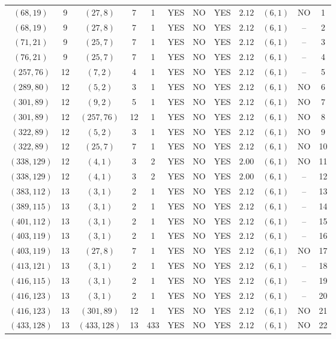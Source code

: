 \begin{longtable}{|c|c|c|c|c|c|c|c|c|c|c|c|}
$(68,19)$ & 9 & $(27,8)$ & 7 & 1 & YES & NO & YES & $2.12$ & $(6,1)$ & NO & 1\\
$(68,19)$ & 9 & $(27,8)$ & 7 & 1 & YES & NO & YES & $2.12$ & $(6,1)$ & -- & 2\\
$(71,21)$ & 9 & $(25,7)$ & 7 & 1 & YES & NO & YES & $2.12$ & $(6,1)$ & -- & 3\\
$(76,21)$ & 9 & $(25,7)$ & 7 & 1 & YES & NO & YES & $2.12$ & $(6,1)$ & -- & 4\\
$(257,76)$ & 12 & $(7,2)$ & 4 & 1 & YES & NO & YES & $2.12$ & $(6,1)$ & -- & 5\\
$(289,80)$ & 12 & $(5,2)$ & 3 & 1 & YES & NO & YES & $2.12$ & $(6,1)$ & NO & 6\\
$(301,89)$ & 12 & $(9,2)$ & 5 & 1 & YES & NO & YES & $2.12$ & $(6,1)$ & NO & 7\\
$(301,89)$ & 12 & $(257,76)$ & 12 & 1 & YES & NO & YES & $2.12$ & $(6,1)$ & NO & 8\\
$(322,89)$ & 12 & $(5,2)$ & 3 & 1 & YES & NO & YES & $2.12$ & $(6,1)$ & NO & 9\\
$(322,89)$ & 12 & $(25,7)$ & 7 & 1 & YES & NO & YES & $2.12$ & $(6,1)$ & NO & 10\\
$(338,129)$ & 12 & $(4,1)$ & 3 & 2 & YES & NO & YES & $2.00$ & $(6,1)$ & NO & 11\\
$(338,129)$ & 12 & $(4,1)$ & 3 & 2 & YES & NO & YES & $2.00$ & $(6,1)$ & -- & 12\\
$(383,112)$ & 13 & $(3,1)$ & 2 & 1 & YES & NO & YES & $2.12$ & $(6,1)$ & -- & 13\\
$(389,115)$ & 13 & $(3,1)$ & 2 & 1 & YES & NO & YES & $2.12$ & $(6,1)$ & -- & 14\\
$(401,112)$ & 13 & $(3,1)$ & 2 & 1 & YES & NO & YES & $2.12$ & $(6,1)$ & -- & 15\\
$(403,119)$ & 13 & $(3,1)$ & 2 & 1 & YES & NO & YES & $2.12$ & $(6,1)$ & -- & 16\\
$(403,119)$ & 13 & $(27,8)$ & 7 & 1 & YES & NO & YES & $2.12$ & $(6,1)$ & NO & 17\\
$(413,121)$ & 13 & $(3,1)$ & 2 & 1 & YES & NO & YES & $2.12$ & $(6,1)$ & -- & 18\\
$(416,115)$ & 13 & $(3,1)$ & 2 & 1 & YES & NO & YES & $2.12$ & $(6,1)$ & -- & 19\\
$(416,123)$ & 13 & $(3,1)$ & 2 & 1 & YES & NO & YES & $2.12$ & $(6,1)$ & -- & 20\\
$(416,123)$ & 13 & $(301,89)$ & 12 & 1 & YES & NO & YES & $2.12$ & $(6,1)$ & NO & 21\\
$(433,128)$ & 13 & $(433,128)$ & 13 & 433 & YES & NO & YES & $2.12$ & $(6,1)$ & NO & 22\\

\end{longtable}
